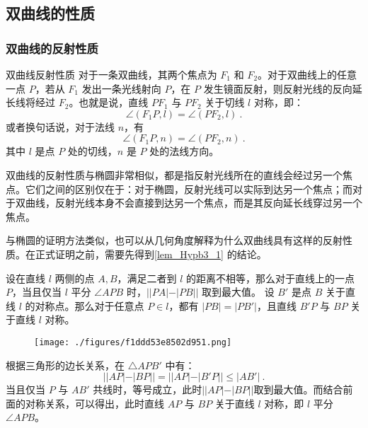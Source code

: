 \subsection{双曲线的性质}

\subsubsection{双曲线的反射性质}

\begin{theorem}{双曲线反射性质}
对于一条双曲线，其两个焦点为 $F_1$ 和 $F_2$。对于双曲线上的任意一点 $P$，若从 $F_1$ 发出一条光线射向 $P$，在 $P$ 发生镜面反射，则反射光线的反向延长线将经过 $F_2$。也就是说，直线 $PF_1$ 与 $PF_2$ 关于切线 $l$ 对称，即：
\begin{equation}
\angle(F_1P, l) = \angle(PF_2, l)~.
\end{equation}
或者换句话说，对于法线 $n$，有
\begin{equation}
\angle(F_1P, n) = \angle(PF_2, n)~.
\end{equation}
其中 $l$ 是点 $P$ 处的切线，$n$ 是 $P$ 处的法线方向。
\end{theorem}

双曲线的反射性质与椭圆非常相似，都是指反射光线所在的直线会经过另一个焦点。它们之间的区别仅在于：对于椭圆，反射光线可以实际到达另一个焦点；而对于双曲线，反射光线本身不会直接到达另一个焦点，而是其反向延长线穿过另一个焦点。

与椭圆的证明方法类似，也可以从几何角度解释为什么双曲线具有这样的反射性质。在正式证明之前，需要先得到\autoref{lem_Hypb3_1} 的结论。

\begin{lemma}{设在直线 $l$ 两侧的点 $A,B$，满足二者到 $l$ 的距离不相等，那么对于直线上的一点 $P$，当且仅当 $l$ 平分 $\angle APB$ 时，$||PA|-|PB||$ 取到最大值。}\label{lem_Hypb3_1}
设 $B'$ 是点 $B$ 关于直线 $l$ 的对称点。那么对于任意点 $P \in l$，都有 $|PB| = |PB'|$，且直线 $B'P$ 与 $BP$ 关于直线 $l$ 对称。

\begin{figure}[ht]
\centering
\texttt{[image: ./figures/f1ddd53e8502d951.png]}
\caption{} \label{fig_Hypb3_10}
\end{figure}

根据三角形的边长关系，在 $\triangle APB'$ 中有：
\begin{equation}
||AP|-|BP||=||AP|-|B'P||\leq|AB'|~.
\end{equation}
当且仅当 $P$ 与 $AB'$ 共线时，等号成立，此时$||AP|-|BP||$取到最大值。而结合前面的对称关系，可以得出，此时直线 $AP$ 与 $BP$ 关于直线 $l$ 对称，即 $l$ 平分 $\angle APB$。
\end{lemma}

